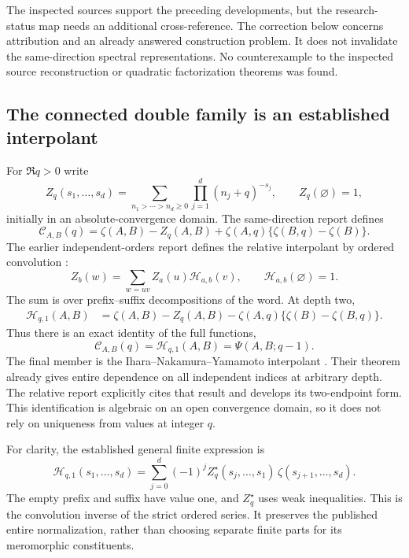 \documentclass[11pt,a4paper]{article}
\numberwithin{equation}{section}
\theoremstyle{plain}
\theoremstyle{definition}
\theoremstyle{remark}
\begin{document}
The inspected sources support the preceding developments, but the
research-status map needs an additional cross-reference.  The correction
below concerns attribution and an already answered construction problem.
It does not invalidate the same-direction spectral representations.
No counterexample to the inspected source reconstruction or quadratic
factorization theorems was found.

\subsection{The connected double family is an established interpolant}

For $\Re q>0$ write
\[
 Z_q(s_1,\ldots,s_d)=
  \sum_{n_1>\cdots>n_d\ge0}\prod_{j=1}^d(n_j+q)^{-s_j},
 \qquad Z_q(\varnothing)=1,
\]
initially in an absolute-convergence domain.  The same-direction report
defines
\begin{equation}\label{audit:connected}
 \mathcal C_{A,B}(q)=\zeta(A,B)-Z_q(A,B)
                      +\zeta(A,q)\{\zeta(B,q)-\zeta(B)\}.
\end{equation}
The earlier independent-orders report defines the relative interpolant
by ordered convolution \cite{IndependentOrders}:
\begin{equation}\label{audit:relative}
 Z_b(w)=\sum_{w=uv}Z_a(u)\mathcal H_{a,b}(v),
 \qquad \mathcal H_{a,b}(\varnothing)=1.
\end{equation}
The sum is over prefix--suffix decompositions of the word.  At depth two,
\begin{align*}
 \mathcal H_{q,1}(A,B)
 &=\zeta(A,B)-Z_q(A,B)
                  -\zeta(A,q)\{\zeta(B)-\zeta(B,q)\}.
\end{align*}
Thus there is an exact identity of the full functions,
\begin{equation}\label{audit:identification}
 \boxed{\mathcal C_{A,B}(q)=\mathcal H_{q,1}(A,B)
                              =\Psi(A,B;q-1).}
\end{equation}
The final member is the Ihara--Nakamura--Yamamoto interpolant
\cite[Proposition 2.1 and Corollary 4.2]{INY}.  Their theorem already
gives entire dependence on all independent indices at arbitrary depth.
The relative report explicitly cites that result and develops its
two-endpoint form.  This identification is algebraic on an open
convergence domain, so it does not rely on uniqueness from values at
integer $q$.

For clarity, the established general finite expression is
\begin{equation}\label{audit:star}
 \mathcal H_{q,1}(s_1,\ldots,s_d)=
  \sum_{j=0}^d(-1)^j
   Z_q^\star(s_j,\ldots,s_1)\,
                         \zeta(s_{j+1},\ldots,s_d).
\end{equation}
The empty prefix and suffix have value one, and $Z_q^\star$ uses weak
inequalities.  This is the convolution inverse of the strict ordered
series.  It preserves the published entire normalization, rather than
choosing separate finite parts for its meromorphic constituents.
\end{document}
